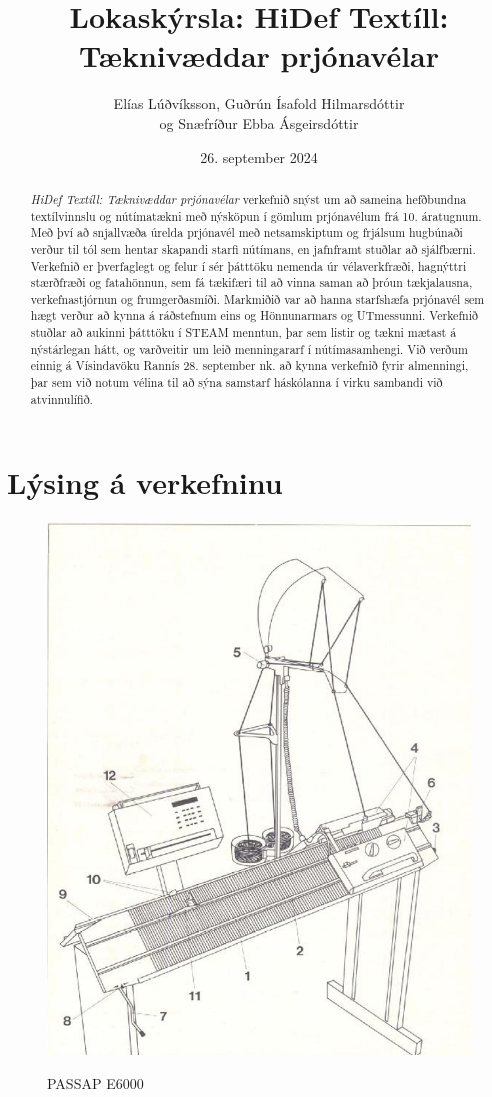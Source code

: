 \documentclass[a4paper,12pt,twoside]{article}
\title{Lokaskýrsla: HiDef Textíll: \\ Tæknivæddar prjónavélar}
\author{Elías Lúðvíksson, Guðrún Ísafold Hilmarsdóttir\\ og Snæfríður Ebba Ásgeirsdóttir}
\date{26. september 2024}
\begin{document}
\maketitle
\begin{abstract}
    \emph{HiDef Textíll: Tæknivæddar prjónavélar} verkefnið snýst um að sameina hefðbundna textílvinnslu og nútímatækni með nýsköpun í gömlum prjónavélum frá 10. áratugnum. Með því að snjallvæða úrelda prjónavél með netsamskiptum og frjálsum hugbúnaði verður til tól sem hentar skapandi starfi nútímans, en jafnframt stuðlar að sjálfbærni. Verkefnið er þverfaglegt og felur í sér þátttöku nemenda úr vélaverkfræði, hagnýttri stærðfræði og fatahönnun, sem fá tækifæri til að vinna saman að þróun tækjalausna, verkefnastjórnun og frumgerðasmíði. Markmiðið var að hanna starfshæfa prjónavél sem hægt verður að kynna á ráðstefnum eins og Hönnunarmars og UTmessunni. Verkefnið stuðlar að aukinni þátttöku í STEAM menntun, þar sem listir og tækni mætast á nýstárlegan hátt, og varðveitir um leið menningararf í nútímasamhengi. Við verðum einnig á Vísindavöku Rannís 28. september nk. að kynna verkefnið fyrir almenningi, þar sem við notum vélina til að sýna samstarf háskólanna í virku sambandi við atvinnulífið.
\end{abstract}

\tableofcontents
\newpage

\section{Lýsing á verkefninu}


\begin{figure} 
    \centering \label{img:passap}
    \includegraphics[width=.9\linewidth]{myndir/skema-e6000.png}
    \caption{PASSAP E6000}
\end{figure}
\end{document}

